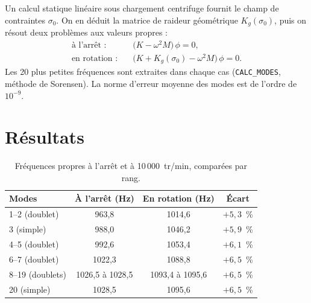 \documentclass[11pt,a4paper]{article}
\begin{document}
Un calcul statique linéaire sous chargement centrifuge fournit le champ de
contraintes $\sigma_0$. On en déduit la matrice de raideur géométrique
$K_g(\sigma_0)$, puis on résout deux problèmes aux valeurs propres :
\begin{align*}
\text{à l'arrêt :}\quad & \bigl(K - \omega^2 M\bigr)\,\phi = 0, \\
\text{en rotation :}\quad & \bigl(K + K_g(\sigma_0) - \omega^2 M\bigr)\,\phi = 0.
\end{align*}
Les 20 plus petites fréquences sont extraites dans chaque cas
(\texttt{CALC\_MODES}, méthode de Sorensen). La norme d'erreur moyenne des
modes est de l'ordre de $10^{-9}$.

\section{Résultats}

\begin{table}[H]
\centering
\begin{tabular}{lccc}
\toprule
Modes & À l'arrêt (Hz) & En rotation (Hz) & Écart \\
\midrule
1--2 (doublet)  & 963,8  & 1014,6 & $+5{,}3$~\% \\
3 (simple)      & 988,0  & 1046,2 & $+5{,}9$~\% \\
4--5 (doublet)  & 992,6  & 1053,4 & $+6{,}1$~\% \\
6--7 (doublet)  & 1022,3 & 1088,8 & $+6{,}5$~\% \\
8--19 (doublets) & 1026,5 à 1028,5 & 1093,4 à 1095,6 & $+6{,}5$~\% \\
20 (simple)     & 1028,5 & 1095,6 & $+6{,}5$~\% \\
\bottomrule
\end{tabular}
\caption{Fréquences propres à l'arrêt et à 10\,000~tr/min, comparées par rang.}
\end{table}
\end{document}
